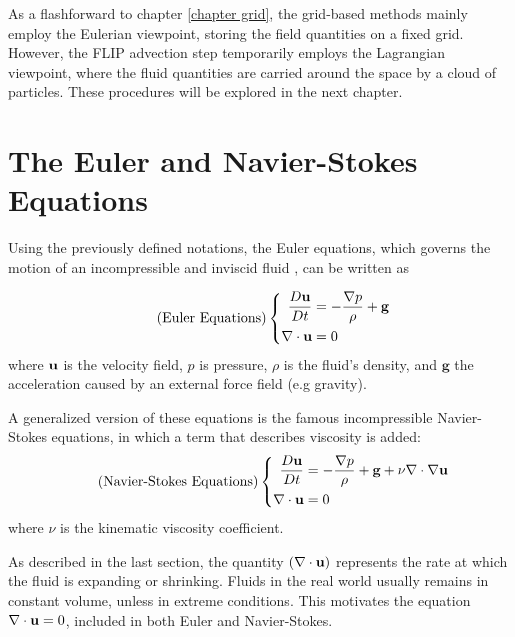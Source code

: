 As a flashforward to chapter \ref{chapter grid}, the grid-based methods mainly employ the Eulerian viewpoint, storing the field quantities on a fixed grid. However, the FLIP advection step temporarily employs the Lagrangian viewpoint, where the fluid quantities are carried around the space by a cloud of particles. These procedures will be explored in the next chapter.










\section{The Euler and Navier-Stokes Equations}
\label{Euler N-S Eqns}

Using the previously defined notations, the Euler equations, which governs the motion of an incompressible and inviscid fluid
, can be written as

\begin{equation}
    \tag{Euler Equations}
    \left \{
    \begin{aligned}
         \frac{D\textbf{u}}{Dt}   &=   -\frac{\nabla p}{\rho} + \textbf{g} \\
         \nabla \cdot \textbf{u}   &=   0
    \end{aligned} \right.
    \label{eqn:Euler Equations}
\end{equation} 
where $\textbf{u}$ is the velocity field, $p$ is pressure, $\rho$ is the fluid's density, and $\textbf{g}$ the acceleration caused by an external force field (e.g gravity).

A generalized version of these equations is the famous incompressible Navier-Stokes equations, in which a term that describes viscosity is added:
\begin{equation}
    \tag{Navier-Stokes Equations}
    \left \{
    \begin{aligned}
         \frac{D\textbf{u}}{Dt}   &=   -\frac{\nabla p}{\rho} + \textbf{g} + \nu \nabla \cdot \nabla \textbf{u} \\
         \nabla \cdot \textbf{u}  &=   0
    \end{aligned} \right.
    \label{eqn:Navier-Stokes Equations}
\end{equation} 
where $\nu$ is the kinematic viscosity coefficient.


As described in the last section, the quantity $(\nabla \cdot \textbf{u})$ represents the rate at which the fluid is expanding or shrinking. Fluids in the real world usually remains in constant volume, unless in extreme conditions. This motivates the equation $\nabla \cdot \textbf{u} = 0$, included in both Euler and Navier-Stokes.


